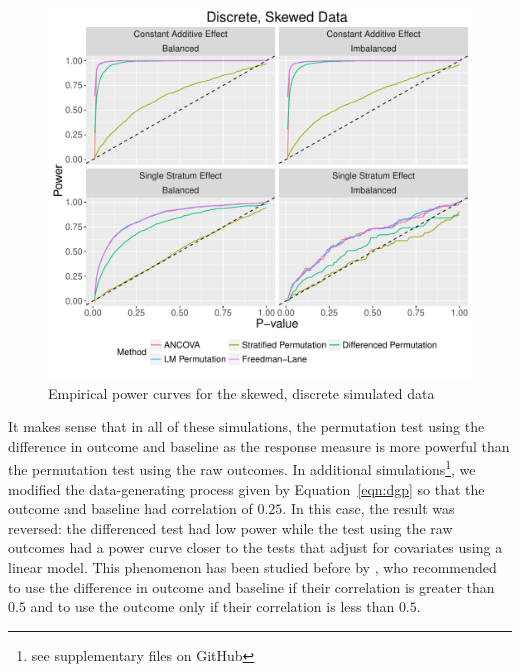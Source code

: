 \documentclass[11pt]{article}
\begin{document}
\begin{figure}
\centering
\includegraphics[width = \textwidth]{fig/skewed_simulation_power}
\caption{Empirical power curves for the skewed, discrete simulated data}
\label{fig:skewed_sim_power}
\end{figure}

\begin{center}

\end{center}

It makes sense that in all of these simulations, the permutation test using the difference in outcome and baseline as the response measure is more powerful than the permutation test using the raw outcomes.
In additional simulations\footnote{see supplementary files on GitHub}, we modified the data-generating process given by Equation~\ref{eqn:dgp} so that the outcome and baseline had correlation of $0.25$.
In this case, the result was reversed: the differenced test had low power while the test using the raw outcomes had a power curve closer to the tests that adjust for covariates using a linear model.
This phenomenon has been studied before by \citet{frison_repeated_1992}, who recommended to use the difference in outcome and baseline if their correlation is greater than $0.5$ and to use the outcome only if their correlation is less than $0.5$.
\end{document}
